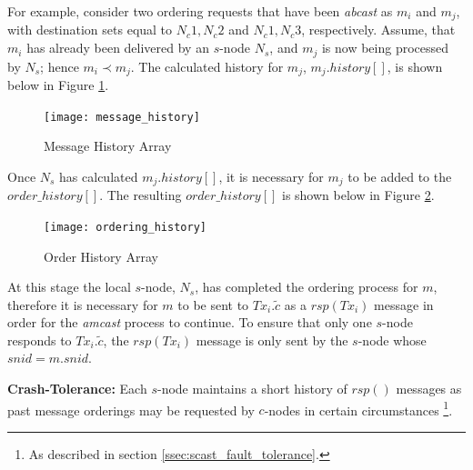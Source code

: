 \begin{enumerate}
        For example, consider two ordering requests that have been \emph{abcast} as $m_i$ and $m_j$, with destination sets equal to ${N_c1, N_c2}$ and ${N_c1, N_c3}$, respectively.  Assume, that $m_i$ has already been delivered by an $s$-node $N_s$, and $m_j$ is now being processed by $N_s$; hence $m_i \prec m_j$.  The calculated history for $m_j$, $m_j.history[]$, is shown below in Figure \ref{fig:message_history}.
        
    \begin{figure}[htbp!] 
        \centering    
         \texttt{[image: message\_history]}
         \caption[Message History Array]{Message History Array}
         \label{fig:message_history}
    \end{figure}            
        
        Once $N_s$ has calculated $m_j.history[]$, it is necessary for $m_j$ to be added to the $order\_history[]$.  The resulting $order\_history[]$ is shown below in Figure \ref{fig:ordering_history}.  
		
        \begin{figure}[htbp!] 
        \centering    
         \texttt{[image: ordering\_history]}
         \caption[Order History Array]{Order History Array}
         \label{fig:ordering_history}
    \end{figure}            
        
		
        At this stage the local $s$-node, $N_s$, has completed the ordering process for $m$, therefore it is necessary for $m$ to be sent to $Tx_i.\tilde{c}$ as a $rsp(Tx_i)$ message in order for the \emph{amcast} process to continue.  To ensure that only one $s$-node responds to $Tx_i.\tilde{c}$, the $rsp(Tx_i)$ message is only sent by the $s$-node whose $snid = m.snid$.  
        
        \textbf{Crash-Tolerance:} Each $s$-node maintains a short history of $rsp()$ messages as past message orderings may be requested by $c$-nodes in certain circumstances \footnote{As described in section \ref{ssec:scast_fault_tolerance}.}.          
        

\end{enumerate}
